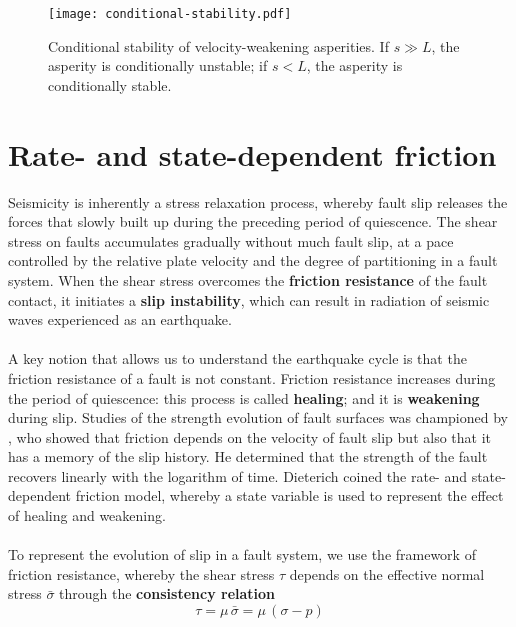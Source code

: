 \documentclass[letterpaper,12pt,]{memoir}
\begin{document}
%
\begin{figure}[h]
\begin{center}
\texttt{[image: conditional-stability.pdf]}
\caption{Conditional stability of velocity-weakening asperities. If $s\gg L$, the asperity is conditionally unstable; if $s < L$, the asperity is conditionally stable.}
\end{center}
\end{figure}
\vspace{-0.5cm}
%


\clearpage

\section{Rate- and state-dependent friction}

Seismicity is inherently a stress relaxation process, whereby fault slip releases the forces that slowly built up during the preceding period of quiescence. The shear stress on faults accumulates gradually without much fault slip, at a pace controlled by the relative plate velocity and the degree of partitioning in a fault system. When the shear stress overcomes the \textbf{friction resistance} of the fault contact, it initiates a \textbf{slip instability}, which can result in radiation of seismic waves experienced as an earthquake.\\ 
%
\\
A key notion that allows us to understand the earthquake cycle is that the friction resistance of a fault is not constant. Friction resistance increases during the period of quiescence: this process is called \textbf{healing}; and it is \textbf{weakening} during slip. Studies of the strength evolution of fault surfaces was championed by \cite{dieterich72,dieterich78}, who showed that friction depends on the velocity of fault slip but also that it has a memory of the slip history. He determined that the strength of the fault recovers linearly with the logarithm of time. Dieterich coined the rate- and state-dependent friction model, whereby a state variable is used to represent the effect of healing and weakening. \\
%
\\
To represent the evolution of slip in a fault system, we use the framework of friction resistance, whereby the shear stress $\tau$ depends on the effective normal stress $\bar{\sigma}$ through the \textbf{consistency relation}
\begin{equation}\label{eqn:consistency}
\tau=\mu\,\bar{\sigma}=\mu\,(\sigma-p)
\end{equation}
\end{document}
